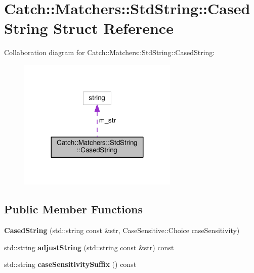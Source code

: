 \hypertarget{structCatch_1_1Matchers_1_1StdString_1_1CasedString}{}\section{Catch\+:\+:Matchers\+:\+:Std\+String\+:\+:Cased\+String Struct Reference}
\label{structCatch_1_1Matchers_1_1StdString_1_1CasedString}


Collaboration diagram for Catch\+:\+:Matchers\+:\+:Std\+String\+:\+:Cased\+String\+:\nopagebreak
\begin{figure}[H]
\begin{center}
\leavevmode
\includegraphics[width=216pt]{structCatch_1_1Matchers_1_1StdString_1_1CasedString__coll__graph}
\end{center}
\end{figure}
\subsection*{Public Member Functions}
\begin{DoxyCompactItemize}
\item 
{\bfseries Cased\+String} (std\+::string const \&str, Case\+Sensitive\+::\+Choice case\+Sensitivity)\hypertarget{structCatch_1_1Matchers_1_1StdString_1_1CasedString_aa88bbc5acd2bff22351d8d4b1816b561}{}\label{structCatch_1_1Matchers_1_1StdString_1_1CasedString_aa88bbc5acd2bff22351d8d4b1816b561}

\item 
std\+::string {\bfseries adjust\+String} (std\+::string const \&str) const \hypertarget{structCatch_1_1Matchers_1_1StdString_1_1CasedString_a0ff84e194426c8f4bca0660b9180d20d}{}\label{structCatch_1_1Matchers_1_1StdString_1_1CasedString_a0ff84e194426c8f4bca0660b9180d20d}

\item 
std\+::string {\bfseries case\+Sensitivity\+Suffix} () const \hypertarget{structCatch_1_1Matchers_1_1StdString_1_1CasedString_a1113c80dd02967032a99290bdcd1b590}{}\label{structCatch_1_1Matchers_1_1StdString_1_1CasedString_a1113c80dd02967032a99290bdcd1b590}

\end{DoxyCompactItemize}
